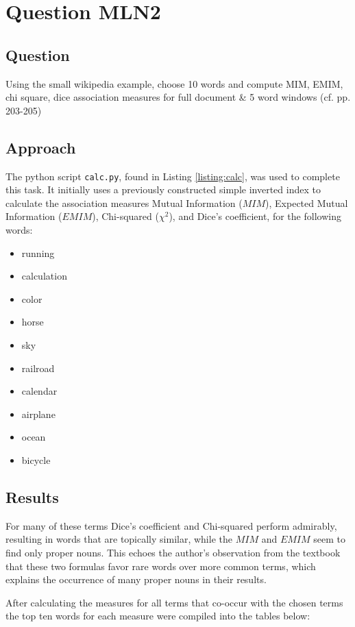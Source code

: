 \section{Question MLN2}

\subsection{Question}
Using the small wikipedia example, choose 10 words and compute MIM, EMIM, chi square, dice association measures for full document \& 5 word windows (cf. pp. 203-205)

\subsection{Approach}
The python script \texttt{calc.py}, found in Listing \ref{listing:calc}, was used to complete this task.  It initially uses a previously constructed simple inverted index to calculate the association measures Mutual Information (\(MIM\)), Expected Mutual Information (\(EMIM\)), Chi-squared (\(\chi^2\)), and Dice's coefficient, for the following words:
    
\begin{itemize}
    \item running
    \item calculation
    \item color
    \item horse
    \item sky
    \item railroad
    \item calendar
    \item airplane
    \item ocean
    \item bicycle
\end{itemize}

\subsection{Results}
For many of these terms Dice's coefficient and Chi-squared perform admirably, resulting in words that are topically similar, while the \(MIM\) and \(EMIM\) seem to find only proper nouns.  This echoes the author's observation from the textbook that these two formulas favor rare words over more common terms, which explains the occurrence of many proper nouns in their results.

After calculating the measures for all terms that co-occur with the chosen terms the top ten words for each measure were compiled into the tables below:


